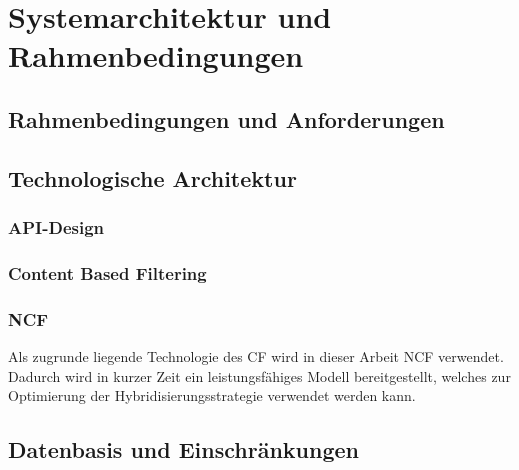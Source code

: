 \section{Systemarchitektur und Rahmenbedingungen}

\subsection{Rahmenbedingungen und Anforderungen}

\subsection{Technologische Architektur}
\subsubsection{API-Design}
\subsubsection{Content Based Filtering}
\subsubsection{NCF}
Als zugrunde liegende Technologie des \ac{CF} wird in dieser Arbeit \ac{NCF} verwendet. Dadurch wird in kurzer Zeit 
ein leistungsfähiges Modell bereitgestellt, welches zur Optimierung der Hybridisierungsstrategie verwendet werden kann.



\subsection{Datenbasis und Einschränkungen}
